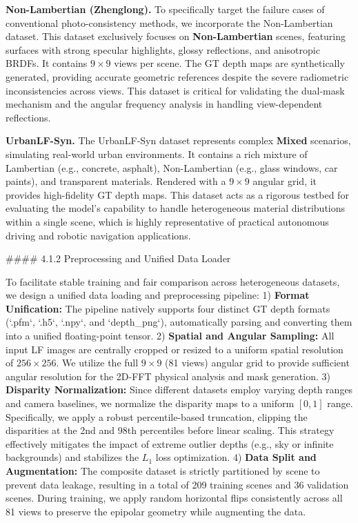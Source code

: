 \textbf{Non-Lambertian (Zhenglong).} To specifically target the failure cases of conventional photo-consistency methods, we incorporate the Non-Lambertian dataset. This dataset exclusively focuses on \textbf{Non-Lambertian} scenes, featuring surfaces with strong specular highlights, glossy reflections, and anisotropic BRDFs. It contains $9 \times 9$ views per scene. The GT depth maps are synthetically generated, providing accurate geometric references despite the severe radiometric inconsistencies across views. This dataset is critical for validating the dual-mask mechanism and the angular frequency analysis in handling view-dependent reflections.

\textbf{UrbanLF-Syn.} The UrbanLF-Syn dataset represents complex \textbf{Mixed} scenarios, simulating real-world urban environments. It contains a rich mixture of Lambertian (e.g., concrete, asphalt), Non-Lambertian (e.g., glass windows, car paints), and transparent materials. Rendered with a $9 \times 9$ angular grid, it provides high-fidelity GT depth maps. This dataset acts as a rigorous testbed for evaluating the model's capability to handle heterogeneous material distributions within a single scene, which is highly representative of practical autonomous driving and robotic navigation applications.

\#\#\#\# 4.1.2 Preprocessing and Unified Data Loader

To facilitate stable training and fair comparison across heterogeneous datasets, we design a unified data loading and preprocessing pipeline:
1) \textbf{Format Unification:} The pipeline natively supports four distinct GT depth formats (`.pfm`, `.h5`, `.npy`, and `depth_png`), automatically parsing and converting them into a unified floating-point tensor.
2) \textbf{Spatial and Angular Sampling:} All input LF images are centrally cropped or resized to a uniform spatial resolution of $256 \times 256$. We utilize the full $9 \times 9$ (81 views) angular grid to provide sufficient angular resolution for the 2D-FFT physical analysis and mask generation.
3) \textbf{Disparity Normalization:} Since different datasets employ varying depth ranges and camera baselines, we normalize the disparity maps to a uniform $[0, 1]$ range. Specifically, we apply a robust percentile-based truncation, clipping the disparities at the 2nd and 98th percentiles before linear scaling. This strategy effectively mitigates the impact of extreme outlier depths (e.g., sky or infinite backgrounds) and stabilizes the $L_1$ loss optimization.
4) \textbf{Data Split and Augmentation:} The composite dataset is strictly partitioned by scene to prevent data leakage, resulting in a total of 209 training scenes and 36 validation scenes. During training, we apply random horizontal flips consistently across all 81 views to preserve the epipolar geometry while augmenting the data.

